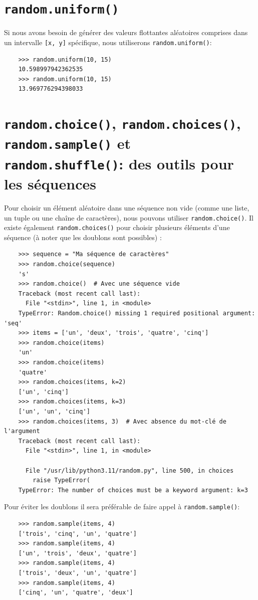 \documentclass[a4paper,12pt]{book}
\begin{document}
\section{\texttt{random.uniform()}}
Si nous avons besoin de générer des valeurs flottantes aléatoires comprises dans un intervalle \texttt{[x, y]} spécifique, nous utiliserons \texttt{random.uniform()}:
\begin{verbatim}
    >>> random.uniform(10, 15)
    10.598997942362535
    >>> random.uniform(10, 15)
    13.969776294398033
\end{verbatim}

\section{\texttt{random.choice()}, \texttt{random.choices()}, \texttt{random.sample()} et \\ \texttt{random.shuffle()}: des outils pour les séquences}
Pour choisir un élément aléatoire dans une séquence non vide (comme une liste, un tuple ou une chaîne de caractères), nous pouvons utiliser \texttt{random.choice()}. Il existe également \texttt{random.choices()} pour choisir plusieurs éléments d'une séquence (à noter que les doublons sont possibles) :
\begin{verbatim}
    >>> sequence = "Ma séquence de caractères"
    >>> random.choice(sequence)
    's'
    >>> random.choice()  # Avec une séquence vide
    Traceback (most recent call last):
      File "<stdin>", line 1, in <module>
    TypeError: Random.choice() missing 1 required positional argument: 'seq'
    >>> items = ['un', 'deux', 'trois', 'quatre', 'cinq']
    >>> random.choice(items)
    'un'
    >>> random.choice(items)
    'quatre'
    >>> random.choices(items, k=2)
    ['un', 'cinq']
    >>> random.choices(items, k=3)
    ['un', 'un', 'cinq']
    >>> random.choices(items, 3)  # Avec absence du mot-clé de l'argument
    Traceback (most recent call last):
      File "<stdin>", line 1, in <module>
      
      File "/usr/lib/python3.11/random.py", line 500, in choices
        raise TypeError(
    TypeError: The number of choices must be a keyword argument: k=3
\end{verbatim}
\medskip

Pour éviter les doublons il sera préférable de faire appel à \texttt{random.sample()}:
\begin{verbatim}
    >>> random.sample(items, 4)
    ['trois', 'cinq', 'un', 'quatre']
    >>> random.sample(items, 4)
    ['un', 'trois', 'deux', 'quatre']
    >>> random.sample(items, 4)
    ['trois', 'deux', 'un', 'quatre']
    >>> random.sample(items, 4)
    ['cinq', 'un', 'quatre', 'deux']
\end{verbatim}
\medskip
\end{document}
